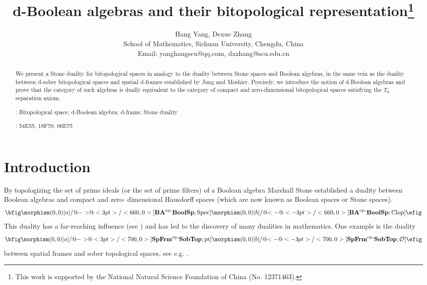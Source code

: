\documentclass[11pt]{article}
\DeclareMathOperator{\pt}{pt}
\DeclareMathOperator{\Spec}{Spec}
\DeclareMathOperator{\Clop}{Clop}
\theoremstyle{plain}
\theoremstyle{definition}
\newcommand{\CO}{\mathcal{O}}
\begin{document}
  
\title{d-Boolean algebras and their bitopological representation\thanks{This work is supported by the National Natural Science Foundation of China (No. 12371463).}}
\author{Hang Yang, Dexue Zhang\\ {\normalsize School of Mathematics, Sichuan University, Chengdu, China}\\ {\normalsize Email: yanghangscu@qq.com, dxzhang@scu.edu.cn}}
\date{}
\maketitle

\begin{abstract} We present a Stone  duality for bitopological spaces in analogy to the duality between Stone spaces and Boolean algebras, in the same vein as the duality between d-sober bitopological spaces and spatial d-frames established by Jung and Moshier. Precisely, we introduce the notion of d-Boolean algebras and prove that the category of such algebras is dually equivalent to the category of   compact and zero-dimensional bitopological spaces satisfying the $T_0$ separation axiom. \vskip 2pt 

: Bitopological space; d-Boolean algebra;  d-frame; Stone duality     

:   54E55, %
18F70, %
06E75 %
\end{abstract}

\section{Introduction} 
By topologizing the set of prime ideals (or  the set of prime filters) of a Boolean algebra  Marshall Stone   \cite{Stone36,Stone37a} established a duality  between Boolean algebras and   compact and zero- dimensional Hausdorff spaces (which are now known as Boolean spaces or Stone spaces).  
$$ \bfig
\morphism(0,0)|a|/@{->}@<3pt>/<660,0>[{\bf BA}^{\rm op}`{\bf BoolSp};\Spec ]
\morphism(0,0)|b|/@{<-}@<-3pt>/<660,0>[{\bf BA}^{\rm op}`{\bf BoolSp}; \Clop] \efig$$
This duality has a far-reaching influence (see  \cite[Introduction]{Johnstone}) and has led to the discovery of many dualities in mathematics. One example is the duality 
$$\bfig
\morphism(0,0)|a|/@{->}@<3pt>/<700,0>[{\bf SpFrm}^{\rm op}`{\bf SobTop};\pt]
\morphism(0,0)|b|/@{<-}@<-3pt>/<700,0>[{\bf SpFrm}^{\rm op}`{\bf SobTop};\CO]  
\efig$$
between  spatial frames and sober topological spaces, see e.g. \cite{Johnstone,PP2012}.
\end{document}
